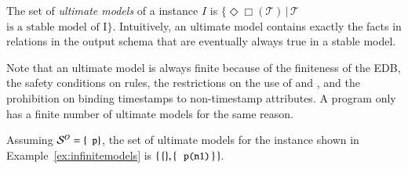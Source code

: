 The set of {\em ultimate models} of a \lang instance $I$ is
$\{\Diamond\Box(\mathcal{T}) \, | \, \mathcal{T}$ $\text{is a stable model of
  I}\}$.  Intuitively, an ultimate model contains exactly the facts in relations
in the output schema that are eventually always true in a stable model.

Note that an ultimate model is always finite because of the finiteness of the EDB, the safety conditions on rules, the restrictions on the use of  and , and the prohibition on binding timestamps to non-timestamp attributes.  A \lang program only has a finite number of ultimate models for the same reason.

\begin{example}
Assuming $\oschema = \{\dedalus{p}\}$, the set of ultimate models for the \lang instance shown in Example~\ref{ex:infinitemodels} is \linebreak $\{ \, \{\}, \{ \, \dedalus{p(n1)} \, \} \, \}$.
\end{example}




